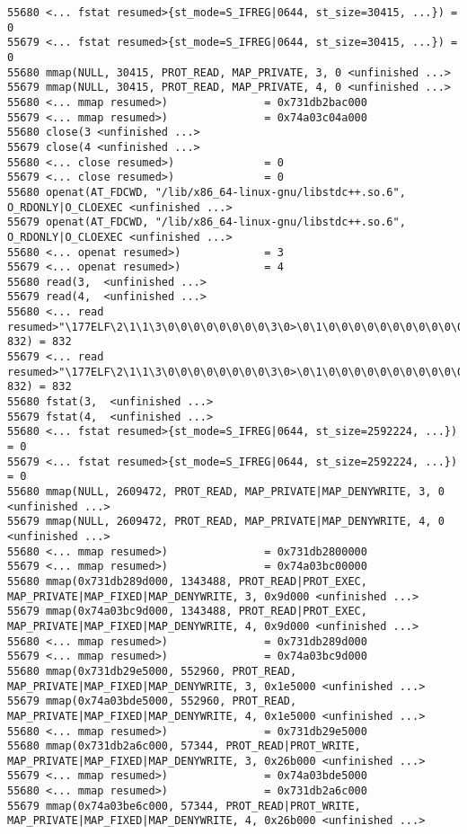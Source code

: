 \begin{verbatim}
55680 <... fstat resumed>{st_mode=S_IFREG|0644, st_size=30415, ...}) = 0
55679 <... fstat resumed>{st_mode=S_IFREG|0644, st_size=30415, ...}) = 0
55680 mmap(NULL, 30415, PROT_READ, MAP_PRIVATE, 3, 0 <unfinished ...>
55679 mmap(NULL, 30415, PROT_READ, MAP_PRIVATE, 4, 0 <unfinished ...>
55680 <... mmap resumed>)               = 0x731db2bac000
55679 <... mmap resumed>)               = 0x74a03c04a000
55680 close(3 <unfinished ...>
55679 close(4 <unfinished ...>
55680 <... close resumed>)              = 0
55679 <... close resumed>)              = 0
55680 openat(AT_FDCWD, "/lib/x86_64-linux-gnu/libstdc++.so.6", O_RDONLY|O_CLOEXEC <unfinished ...>
55679 openat(AT_FDCWD, "/lib/x86_64-linux-gnu/libstdc++.so.6", O_RDONLY|O_CLOEXEC <unfinished ...>
55680 <... openat resumed>)             = 3
55679 <... openat resumed>)             = 4
55680 read(3,  <unfinished ...>
55679 read(4,  <unfinished ...>
55680 <... read resumed>"\177ELF\2\1\1\3\0\0\0\0\0\0\0\0\3\0>\0\1\0\0\0\0\0\0\0\0\0\0\0"..., 832) = 832
55679 <... read resumed>"\177ELF\2\1\1\3\0\0\0\0\0\0\0\0\3\0>\0\1\0\0\0\0\0\0\0\0\0\0\0"..., 832) = 832
55680 fstat(3,  <unfinished ...>
55679 fstat(4,  <unfinished ...>
55680 <... fstat resumed>{st_mode=S_IFREG|0644, st_size=2592224, ...}) = 0
55679 <... fstat resumed>{st_mode=S_IFREG|0644, st_size=2592224, ...}) = 0
55680 mmap(NULL, 2609472, PROT_READ, MAP_PRIVATE|MAP_DENYWRITE, 3, 0 <unfinished ...>
55679 mmap(NULL, 2609472, PROT_READ, MAP_PRIVATE|MAP_DENYWRITE, 4, 0 <unfinished ...>
55680 <... mmap resumed>)               = 0x731db2800000
55679 <... mmap resumed>)               = 0x74a03bc00000
55680 mmap(0x731db289d000, 1343488, PROT_READ|PROT_EXEC, MAP_PRIVATE|MAP_FIXED|MAP_DENYWRITE, 3, 0x9d000 <unfinished ...>
55679 mmap(0x74a03bc9d000, 1343488, PROT_READ|PROT_EXEC, MAP_PRIVATE|MAP_FIXED|MAP_DENYWRITE, 4, 0x9d000 <unfinished ...>
55680 <... mmap resumed>)               = 0x731db289d000
55679 <... mmap resumed>)               = 0x74a03bc9d000
55680 mmap(0x731db29e5000, 552960, PROT_READ, MAP_PRIVATE|MAP_FIXED|MAP_DENYWRITE, 3, 0x1e5000 <unfinished ...>
55679 mmap(0x74a03bde5000, 552960, PROT_READ, MAP_PRIVATE|MAP_FIXED|MAP_DENYWRITE, 4, 0x1e5000 <unfinished ...>
55680 <... mmap resumed>)               = 0x731db29e5000
55680 mmap(0x731db2a6c000, 57344, PROT_READ|PROT_WRITE, MAP_PRIVATE|MAP_FIXED|MAP_DENYWRITE, 3, 0x26b000 <unfinished ...>
55679 <... mmap resumed>)               = 0x74a03bde5000
55680 <... mmap resumed>)               = 0x731db2a6c000
55679 mmap(0x74a03be6c000, 57344, PROT_READ|PROT_WRITE, MAP_PRIVATE|MAP_FIXED|MAP_DENYWRITE, 4, 0x26b000 <unfinished ...>

\end{verbatim}
